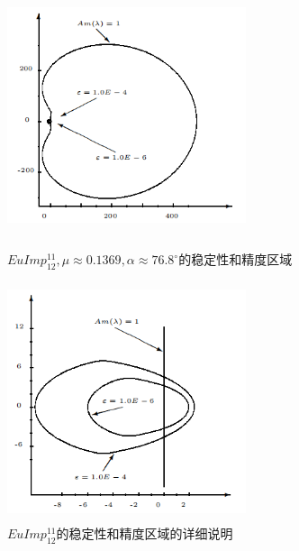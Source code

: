 \documentclass[12pt,a4paper]{article}
\begin{document}
\begin{figure}[htbp]
	{
		\begin{minipage}{6cm}
			\centering
			\includegraphics[width=7cm,height=7cm]{./figures/9.png}
			\caption{$EuImp_{12}^{11},\mu \approx 0.1369, \alpha \approx 76.8^{\circ}$的稳定性和精度区域}
			\label{5.9}
		\end{minipage}
	}
	{
		\begin{minipage}{6cm}
			\centering
			\includegraphics[width=7cm,height=7cm]{./figures/10.png}
			\caption{$EuImp_{12}^{11}$的稳定性和精度区域的详细说明}
			\label{5.10}
		\end{minipage}
	}
\end{figure}
\end{document}
